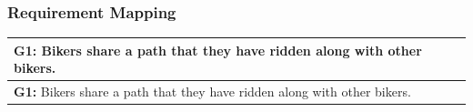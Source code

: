 \documentclass{article}
\begin{document}
\newpage
\subsubsection{Requirement Mapping}

\begin{longtable}{|p{}|p{}|}
    \hline
    \multicolumn{2}{|p{\dimexpr\textwidth-2\tabcolsep-2\arrayrulewidth}|}{
        \textbf{G1:} Bikers share a path that they have ridden along with other bikers.
    } \\
    \hline
    \endfirsthead
    \hline
    \multicolumn{2}{|p{\dimexpr\textwidth-2\tabcolsep-2\arrayrulewidth}|}{
        \textbf{G1:} Bikers share a path that they have ridden along with other bikers.
    } \\
    \hline
    \endhead
 

\end{longtable}
\end{document}
